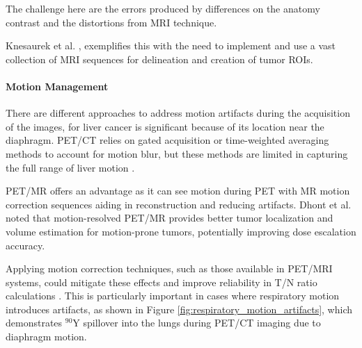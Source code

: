 \documentclass[11pt]{article} %
\begin{document}
\begin{multicols}{2}
The challenge here are the errors produced by differences on the anatomy contrast and the distortions from MRI technique.

Knesaurek et al. \cite{knesaurek2018}, exemplifies this with the need to implement and use a vast collection of MRI sequences for delineation and creation of tumor ROIs. 

\paragraph{Motion Management}

There are different approaches to address motion artifacts during the acquisition of the images, for liver cancer is significant because of its location near the diaphragm. PET/CT relies on gated acquisition or time-weighted averaging methods to account for motion blur, but these methods are limited in capturing the full range of liver motion \cite{Dhont2020}. 

PET/MR offers an advantage as it can see motion during PET with MR motion correction sequences %
 aiding in reconstruction and reducing artifacts\cite{knesaurek2018}. Dhont et al. \cite{Dhont2020} noted that motion-resolved PET/MR provides better tumor localization and volume estimation for motion-prone tumors, potentially improving dose escalation accuracy.

Applying motion correction techniques, %
such as those available in PET/MRI systems, could mitigate these effects and improve reliability in T/N ratio calculations \cite{knesaurek2018}. This is particularly important in cases where respiratory motion introduces artifacts, as shown in Figure \ref{fig:respiratory_motion_artifacts}, which demonstrates $^{90}\text{Y}$ spillover into the lungs during PET/CT imaging due to diaphragm motion.



\end{multicols}
\end{document}
